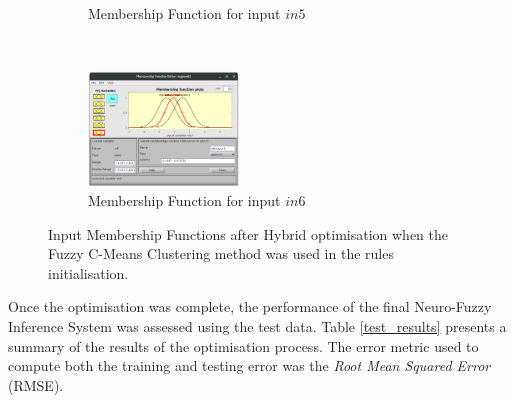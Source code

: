\documentclass[11pt]{article}
\begin{document}
\begin{figure}[ht]
\begin{subfigure}[t]{0.3\textwidth}
		\caption{Membership Function for input $in5$}
	\end{subfigure}
	~
	\begin{subfigure}[t]{0.3\textwidth}
		\centering
		\includegraphics[height=1.2in]{images/fcm_hybrid_in6}
		\caption{Membership Function for input $in6$}
	\end{subfigure}
	\caption{Input Membership Functions after Hybrid optimisation when the Fuzzy C-Means Clustering method was used in the rules initialisation.}
\end{figure}

Once the optimisation was complete, the performance of the final Neuro-Fuzzy Inference System was assessed using the test data. Table \ref{test_results} presents a summary of the results of the optimisation process. The error metric used to compute both the training and testing error was the \emph{Root Mean Squared Error} (RMSE).
\end{document}
